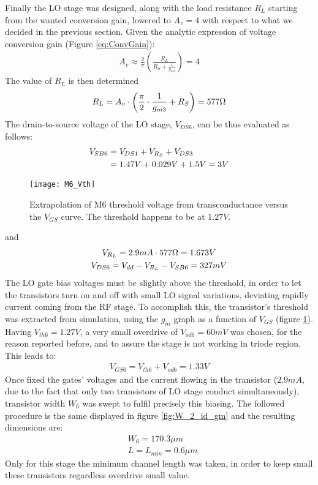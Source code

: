 Finally the LO stage was designed, along with the load resistance \(R_L\) starting from the wanted conversion gain, lowered to  \(A_v=4\) with respect to what we decided in the previous section. Given the analytic expression of voltage conversion gain (Figure \ref{eq:ConvGain}):
\begin{align}
	A_v \approx \frac{2}{\pi}\left( \frac{R_L}{R_S + \frac{1}{g_{m3}}}\right)=4 \nonumber
\end{align}
The value of \(R_L\) is then determined
\begin{align}
	R_L=A_v \cdot \left( \frac{\pi}{2} \cdot\frac{1}{g_{m3}} + R_S \right)=577 \ohm
\end{align}
The drain-to-source voltage of the LO stage, \(V_{DS6}\), can be thus evaluated as follows:
\begin{align}
	V_{SB6}&=V_{DS1}+V_{R_S}+V_{DS3} \notag\\
	&= 1.47V+0.029V+1.5V=3V \nonumber
\end{align}
\begin{figure}[H]
	\centering
	\texttt{[image: M6\_Vth]}
	\caption{Extrapolation of M6 threshold voltage from transconductance versus the \(V_{GS}\) curve. The threshold happens to be at \(1.27V\).}
	\label{M6_Vth}
\end{figure}
and 
\begin{gather}	
	V_{R_L}=2.9mA\cdot 577\ohm=1.673V \nonumber \\
	V_{DS6}=V_{dd}-V_{R_L}-V_{SB6}=327mV \nonumber
\end{gather}
The LO gate bias voltages must be slightly above the threshold, in order to let the transistors turn on and off with small LO signal variations, deviating rapidly current coming from the RF stage. To accomplish this, the transistor's threshold was extracted from simulation, using the \(g_{m}\) graph as a function of \(V_{GS}\) (figure \ref{M6_Vth}). 
Having \(V_{th6}=1.27V\), a very small overdrive of \( V_{od6}=60mV \) was chosen, for the reason reported before, and to assure the stage is not working in triode region. This leads to:
\begin{align}
	V_{GS6}=V_{th6}+V_{od6}=1.33V \nonumber
\end{align}
Once fixed the gates' voltages and the current flowing in the transistor (\(2.9mA\), due to the fact that only two transistors of LO stage conduct simultaneously), transistor width \(W_6\) was swept to fulfil precisely this biasing. The followed procedure is the same displayed in figure \ref{fig:W_2_id_gm} and the resulting dimensions are:
\begin{align}
	&W_6=170.3\mu m \nonumber\\
	&L = L_{min} = 0.6\mu m \nonumber
\end{align}                                                                      
Only for this stage the minimum channel length was taken, in order to keep small these transistors regardless overdrive small value.

